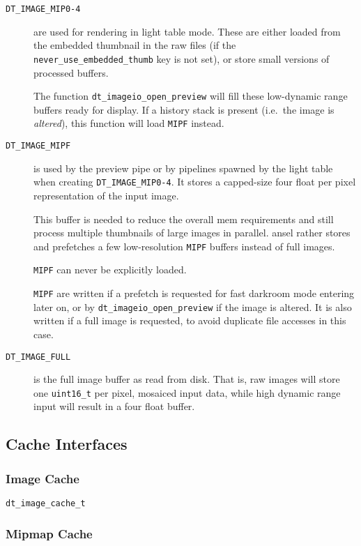 \documentclass[a4paper,twoside]{scrartcl}
\newcommand{\code}[1]{\texttt{\color{codecol}#1}}
\begin{document}
\begin{description}
  \item[\code{DT\_IMAGE\_MIP0-4}] are used for rendering in light table mode. These are either loaded from the embedded
    thumbnail in the raw files (if the \code{never\_use\_embedded\_thumb} key is not set), or store small versions of
    processed buffers.

    The function \code{dt\_imageio\_open\_preview} will fill these low-dynamic range buffers ready for display. If a history
    stack is present (i.e.\ the image is {\em altered}), this function will load \code{MIPF} instead.

  \item[\code{DT\_IMAGE\_MIPF}] is used by the preview pipe or by pipelines spawned by the light table when creating
    \code{DT\_IMAGE\_MIP0-4}. It stores a capped-size four float per pixel representation of the input image.

    This buffer is needed to reduce the overall mem requirements and still process multiple thumbnails of large images
    in parallel. ansel rather stores and prefetches a few low-resolution \code{MIPF} buffers instead of full images.

    \code{MIPF} can never be explicitly loaded.

    \code{MIPF} are written if a prefetch is requested for fast darkroom mode entering later on, or by \code{dt\_imageio\_open\_preview}
    if the image is altered. It is also written if a full image is requested, to avoid duplicate file accesses in this case.

  \item[\code{DT\_IMAGE\_FULL}] is the full image buffer as read from disk. That is, raw images will store one \code{uint16\_t}
    per pixel, mosaiced input data, while high dynamic range input will result in a four float buffer.

\end{description}


\newpage
\subsection{Cache Interfaces}

\subsubsection{Image Cache}

\code{dt\_image\_cache\_t}

\subsubsection{Mipmap Cache}
\end{document}
